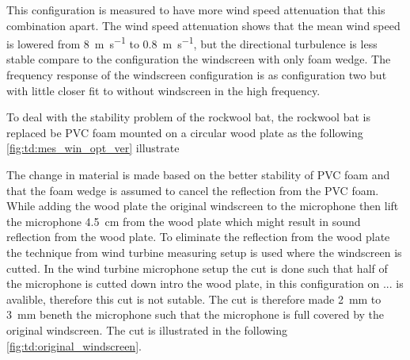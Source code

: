 
This configuration is measured to have more wind speed attenuation that this combination apart. The wind speed attenuation shows that the mean wind speed is lowered from \SI{8}{\meter\per\second} to \SI{0.8}{\meter\per\second}, but the directional turbulence is less stable compare to the configuration the windscreen with only foam wedge. The frequency response of the windscreen configuration is as configuration two but with little closer fit to without windscreen in the high frequency.

To deal with the stability problem of the rockwool bat, the rockwool bat is replaced be PVC foam mounted on a circular wood plate as the following \autoref{fig:td:mes_win_opt_ver} illustrate


The change in material is made based on the better stability of PVC foam and that the foam wedge is assumed to cancel the reflection from the PVC foam. While adding the wood plate the original windscreen to the microphone then lift the microphone \SI{4.5}{\centi\meter} from the wood plate which might result in sound reflection from the wood plate. To eliminate the reflection from the wood plate the technique from wind turbine measuring setup is used where the windscreen is cutted. In the wind turbine microphone setup the cut is done such that half of the microphone is cutted down intro the wood plate, in this configuration on ... is avalible, therefore this cut is not sutable. The cut is therefore made \SI{2}{\milli\meter} to \SI{3}{\milli\meter} beneth the microphone such that the microphone is full covered by the original windscreen. The cut is illustrated in the following \autoref{fig:td:original_windscreen}. 






